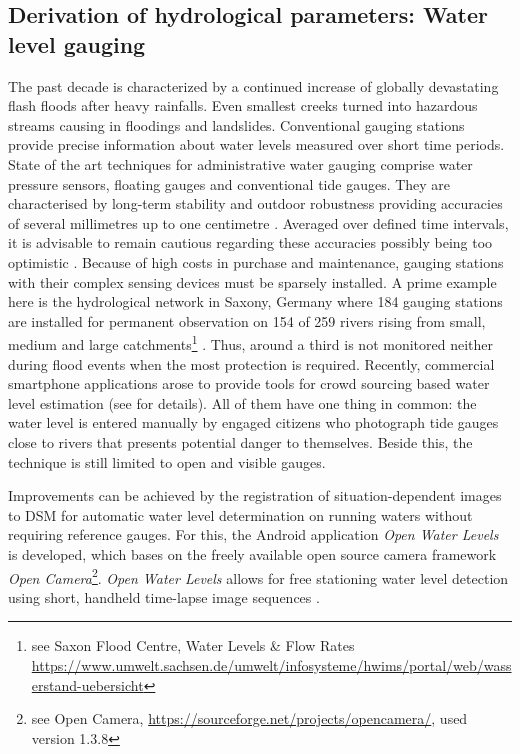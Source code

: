 \documentclass[review]{elsarticle}
\begin{document}
\subsection{Derivation of hydrological parameters: Water level gauging}
\label{sec:water_level_gauging_intro}
The past decade is characterized by a continued increase of globally devastating flash floods after heavy rainfalls. Even smallest creeks turned into hazardous streams causing in floodings and landslides. Conventional gauging stations provide precise information about water levels measured over short time periods. State of the art techniques for administrative water gauging comprise water pressure sensors, floating gauges and conventional tide gauges. They are characterised by long-term stability and outdoor robustness providing accuracies of several millimetres up to one centimetre \cite{Siedschlag2015}. Averaged over defined time intervals, it is advisable to remain cautious regarding these accuracies possibly being too optimistic \cite{Horner2018}. Because of high costs in purchase and maintenance, gauging stations with their complex sensing devices must be sparsely installed. A prime example here is the hydrological network in Saxony, Germany where 184 gauging stations are installed for permanent observation on 154 of 259 rivers rising from small, medium and large catchments\footnote{see Saxon Flood Centre, Water Levels \& Flow Rates \url{https://www.umwelt.sachsen.de/umwelt/infosysteme/hwims/portal/web/wasserstand-uebersicht}} \cite{Buettner2015}. Thus, around a third is not monitored neither during flood events when the most protection is required. Recently, commercial smartphone applications arose to provide tools for crowd sourcing based water level estimation (see \cite{CrowdWaterApp2017a,Kisters2014} for details). All of them have one thing in common: the water level is entered manually by engaged citizens who photograph tide gauges close to rivers that presents potential danger to themselves. Beside this, the technique is still limited to open and visible gauges.

Improvements can be achieved by the registration of situation-dependent images to \gls{DSM} for automatic water level determination on running waters without requiring reference gauges. 
For this, the Android application \textit{Open Water Levels} is developed, which bases on the freely available open source camera framework \textit{Open Camera}\footnote{see Open Camera, \url{https://sourceforge.net/projects/opencamera/}, used version 1.3.8}. \textit{Open Water Levels} allows for free stationing water level detection using short, handheld time-lapse image sequences \cite{Kroehnert2017a}. 
\end{document}
